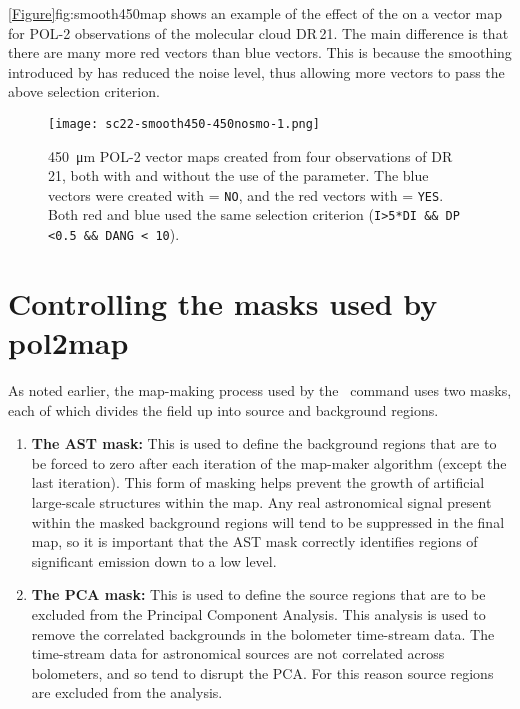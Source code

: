 \cref{Figure}{fig:smooth450map}{} shows an example of the effect of the
 on a vector map for POL-2 observations of the molecular
cloud DR\,21. The main difference is that there are many more red vectors than
blue vectors. This is because the smoothing introduced by 
has reduced the noise level, thus allowing more vectors to pass the above
selection criterion.

\begin{figure}[ht!]
\begin{center}
\texttt{[image: sc22-smooth450-450nosmo-1.png]}
\caption [Example vector map showing the effect of the \poltwomap\  parameter.]{
  \SI{450}{\micro\metre} POL-2 vector maps created from four observations of
  DR\,21, both with and without the use of the  parameter. The blue
  vectors were created with  = \texttt{NO}, and the red vectors with
   = \texttt{YES}. Both red and blue used the same selection criterion
  (\texttt{I>5*DI \&\& DP <0.5 \&\& DANG < 10}).
\label{fig:smooth450map}
}
\end{center}
\end{figure}


\section{Controlling the masks used by pol2map}

As noted earlier, the map-making process used by the \poltwomap\ command uses
two masks, each of which divides the field up into source and background
regions.

\begin{enumerate}
\item {\bf The AST mask:} This is used to define the background regions that are to be 
forced to zero after each iteration of the map-maker algorithm (except the last
iteration). This form of masking helps prevent the growth of artificial large-scale 
structures within the map. Any real astronomical signal present within the masked
background regions will tend to be suppressed in the final map, so it is important
that the AST mask correctly identifies regions of significant emission down to a low level.

\item {\bf The PCA mask:} This is used to define the source regions that are
to be excluded from the Principal Component Analysis. This analysis is used to
remove the correlated backgrounds in the bolometer time-stream data. The
time-stream data for astronomical sources are not correlated across
bolometers, and so tend to disrupt the PCA. For this reason source regions are
excluded from the analysis. \end{enumerate}


